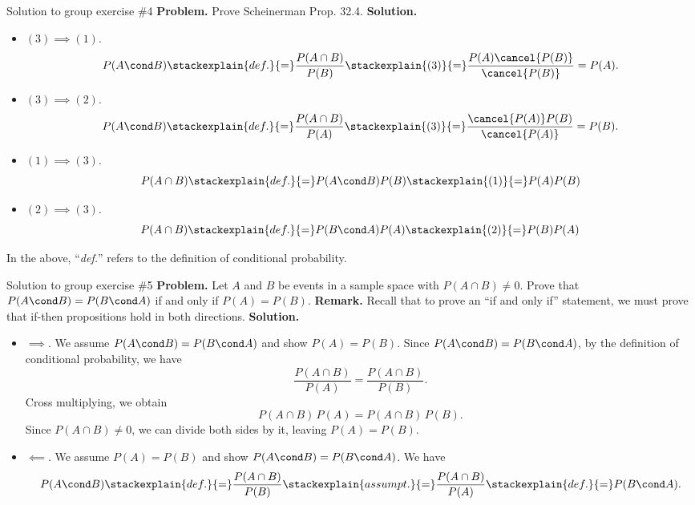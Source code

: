 \documentclass[10pt]{beamer}
\begin{document}
\begin{frame}{Solution to group exercise \#4}
\small 
\textbf{Problem.} Prove Scheinerman Prop. 32.4.
\vfill 
\textbf{Solution.} 
\begin{itemize}
\item $\boxed{(3) \implies (1).}$
\[ P(A \cond B) \stackexplain{def.}{=}	 \frac{P(A \cap B)}{P(B)} \stackexplain{(3)}{=}	   \frac{P(A) \cancel{P(B)}}{\cancel{P(B)}} = P(A).  \]
\item $\boxed{(3) \implies (2).}$
\[ P(A \cond B) \stackexplain{def.}{=}	 \frac{P(A \cap B)}{P(A)} \stackexplain{(3)}{=}	   \frac{ \cancel{P(A)} P(B)}{\cancel{P(A)}} = P(B).  \]
\item $\boxed{(1) \implies (3).}$
\[ P(A \cap B) \stackexplain{def.}{=}	  P(A \cond B) P(B) \stackexplain{(1)}{=}	P(A) P(B) \]
\item $\boxed{(2) \implies (3).}$
\[ P(A \cap B) \stackexplain{def.}{=}	  P(B \cond A) P(A) \stackexplain{(2)}{=}	P(B) P(A) \]
\end{itemize}
In the above, \enquote{\textit{def.}} refers to the definition of conditional probability.
\end{frame}


\begin{frame}{Solution to group exercise \#5}
\small 
\textbf{Problem.} Let $A$ and $B$ be events in a sample space with $P(A \cap B) \neq 0$.  Prove that $P(A \cond B) = P(B \cond A)$ if and only if $P(A) = P(B)$.
\vfill 
\vspace{-.1cm}
\textbf{Remark.} Recall that to prove an \enquote{if and only if} statement, we must prove that if-then propositions hold in both directions. 
\vfill 
\vspace{-.1cm}
\textbf{Solution.}
\begin{itemize}
\item $\boxed{\implies}$. We assume $P(A \cond B) = P(B \cond A)$  and show $P(A) = P(B)$.   Since $P(A \cond B) = P(B \cond A)$, by the definition of conditional probability, we have
\[ \frac{P(A \cap B)}{P(A)} =  \frac{P(A \cap B)}{P(B)}.\] 
 Cross multiplying, we obtain
 \[ P(A \cap B) \, P(A) =  P(A \cap B) \, P(B). \]
 Since $P(A \cap B) \neq 0$, we can divide both sides by it, leaving $P(A)=P(B)$. %
\item $\boxed{\impliedby}$. We assume $P(A) = P(B)$ and show $P(A \cond B) = P(B \cond A)$.   We have
%
\begin{align*}
P(A \cond B) 	\stackexplain{def.}{=}	 \frac{P(A \cap B)}{P(B)} \stackexplain{assumpt.}{=}	\frac{P(A \cap B)}{P(A)}\stackexplain{def.}{=}	P(B \cond A). 
\end{align*}

\end{itemize}

\end{frame}
\end{document}
